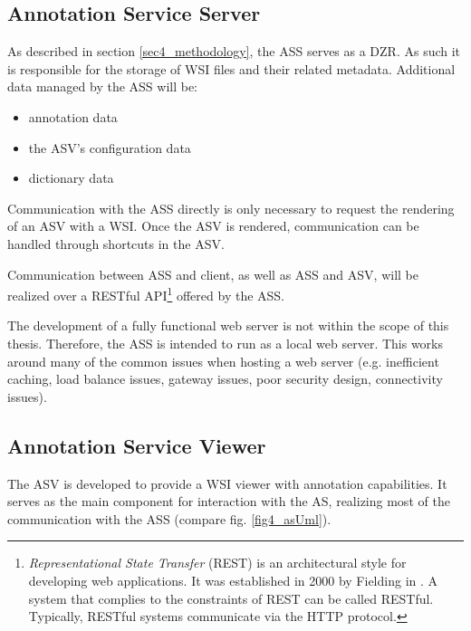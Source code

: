 \subsection{Annotation Service Server}
\label{sec4_assPart}
As described in section \ref{sec4_methodology}, the ASS serves as a DZR. As such it is responsible for the storage of WSI files and their related metadata\cite{Cornish13}. Additional data managed by the ASS will be:

\begin{itemize}
	\item annotation data
	\item the ASV's configuration data
	\item dictionary data
\end{itemize}

Communication with the ASS directly is only necessary to request the rendering of an ASV with a WSI. Once the ASV is rendered, communication can be handled through shortcuts in the ASV.\clearpage

Communication between ASS and client, as well as ASS and ASV, will be realized over a RESTful API\footnote{
	\emph{Representational State Transfer} (REST) is an architectural style for developing web applications. It was established in 2000 by Fielding in \cite{Fielding00}. A system that complies to the constraints of REST can be called RESTful. Typically, RESTful systems communicate via the HTTP protocol\cite{Fielding00}.
	} offered by the ASS.

The development of a fully functional web server is not within the scope of this thesis. Therefore, the ASS is intended to run as a local web server. This works around many of the common issues when hosting a web server (e.g. inefficient caching, load balance issues, gateway issues, poor security design, connectivity issues)\cite{web:typicalissues}.


\subsection{Annotation Service Viewer}
\label{sec4_asvPart}

The ASV is developed to provide a WSI viewer with annotation capabilities. It serves as the main component for interaction with the AS, realizing most of the communication with the ASS (compare fig. \ref{fig4_asUml}).

